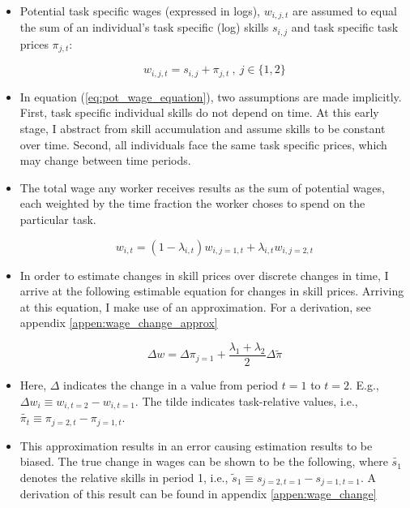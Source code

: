 \documentclass{article}
\begin{document}
	\begin{itemize}
		\item{Potential task specific wages (expressed in logs), $w_{i, j, t}$ are assumed to equal the sum of an individual's task specific (log) skills $s_{i,j}$ and task specific task prices $\pi_{j,t}$:}

		\begin{equation} \label{eq:pot_wage_equation}
		w_{i,j,t} = s_{i,j} + \pi_{j,t} \:, \:  j \in \{1, 2\}
		\end{equation}

		\item{In equation (\ref{eq:pot_wage_equation}), two assumptions are made implicitly. First, task specific individual skills do not depend on time. At this early stage, I abstract from skill accumulation and assume skills to be constant over time. Second, all individuals face the same task specific prices, which may change between time periods.}
		\item{The total wage any worker receives results as the sum of potential wages, each weighted by the time fraction the worker choses to spend on the particular task.}

		\begin{equation}
			w_{i,t} = (1- \lambda_{i,t}) w_{i, j=1, t} + \lambda_{i,t} w_{i, j=2, t}
		\end{equation}

		\item{In order to estimate changes in skill prices over discrete changes in time, I arrive at the following estimable equation for changes in skill prices. Arriving at this equation, I make use of an approximation. For a derivation, see appendix \ref{appen:wage_change_approx}}
		
		\begin{equation}
		\Delta w = \Delta \pi_{j=1} + \frac{\lambda_1 + \lambda_2}{2} \Delta \tilde{\pi}
		\end{equation}

		\item{Here, $\Delta$ indicates the change in a value from period $t=1$ to $t=2$. E.g., $\Delta w_i \equiv w_{i, t=2} - w_{i, t=1}$. The tilde indicates task-relative values, i.e., $\tilde{\pi_t} \equiv \pi_{j=2, t} - \pi_{j=1, t}$.}
		\item{This approximation results in an error causing estimation results to be biased. The true change in wages can be shown to be the following, where $\tilde{s_1}$ denotes the relative skills in period 1, i.e., $\tilde{s}_1 \equiv s_{j=2, t=1} - s_{j=1, t=1}$. A derivation of this result can be found in appendix \ref{appen:wage_change}}


\end{itemize}
\end{document}
